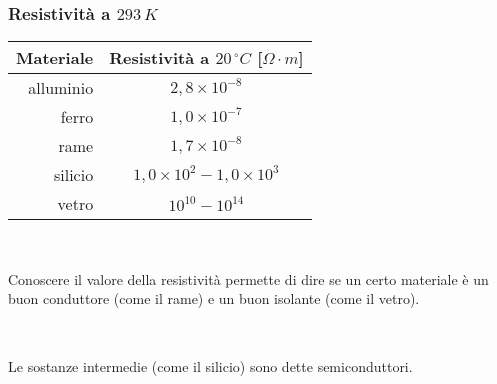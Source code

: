 \documentclass[]{beamer}
\theoremstyle{plain}
\begin{document}
\begin{frame}
\frametitle{Resistività a $ 293 \, K $}
\begin{table}[htb]\centering\footnotesize
  \begin{tabular}{rc}\toprule
  \textbf{Materiale} & \textbf{Resistività a $ 20\, ^\circ C$ [$ \Omega \cdot m $]}\\\midrule
  alluminio & $ 2,8 \times 10^{-8} $\\\addlinespace[1em] 
  ferro     & $ 1,0 \times 10^{-7} $\\\addlinespace[1em]
  rame      & $ 1,7 \times 10^{-8} $\\\addlinespace[1em]
  silicio   & $ 1,0 \times 10^{2}-1,0 \times 10^{3} $\\\addlinespace[1em]
  vetro     & $ 10^{10}-10^{14} $\\\bottomrule
  \end{tabular}
  \end{table}\pause

  ~

Conoscere il valore della resistività permette di dire se un certo materiale è un buon conduttore (come il rame) e un buon isolante (come il vetro).\pause

~

Le sostanze intermedie (come il silicio) sono dette \alert{semiconduttori}.
\end{frame}
\end{document}
